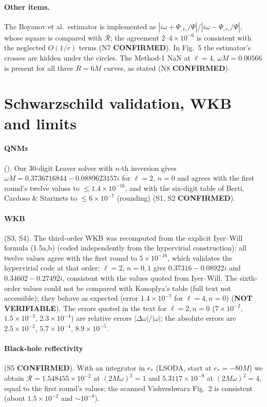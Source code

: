 \documentclass[11pt,a4paper]{article}
\newcommand{\OK}{\textcolor{green!50!black}{\textbf{CONFIRMED}}}
\newcommand{\NV}{\textcolor{gray!80!black}{\textbf{NOT VERIFIABLE}}}
\newcommand{\file}[1]{{\small\path{#1}}}
\begin{document}
\paragraph{Other items.} The Boyanov et al.\ estimator is implemented as $|i\omega+\Psi_{,r_*}/\Psi|/|i\omega-\Psi_{,r_*}/\Psi|$,
whose square is compared with $\mathcal R$; the agreement $2$--$4\times10^{-6}$ is consistent with the neglected $O(1/r)$
terms (N7 \OK). In Fig.~5 the estimator's crosses are hidden under the circles. The Method-1 NaN at $\ell=4$,
$\omega M=0.00566$ is present for all three $R=6M$ curves, as stated (N8 \OK).

\section{Schwarzschild validation, WKB and limits}
\paragraph{QNMs} (\file{c02}). Our 30-digit Leaver solver with $n$-th inversion gives
$\omega M=0.3736716844-0.0889623157i$ for $\ell=2$, $n=0$ and agrees with the first round's twelve values to
$\le1.4\times10^{-16}$, and with the six-digit table of Berti, Cardoso \& Starinets to $\le6\times10^{-7}$ (rounding)
(S1, S2 \OK).

\paragraph{WKB} (S3, S4). The third-order WKB was recomputed from the explicit Iyer--Will formula (1.5a,b)
(coded independently from the hypervirial construction): all twelve values agree with the first round to
$5\times10^{-16}$, which validates the hypervirial code at that order; $\ell=2$, $n=0,1$ give $0.37316-0.08922i$ and
$0.34602-0.27492i$, consistent with the values quoted from Iyer--Will. The sixth-order values could not be compared
with Konoplya's table (full text not accessible); they behave as expected (error $1.4\times10^{-7}$ for $\ell=4,n=0$)
(\NV). The errors quoted in the text for $\ell=2,n=0$ ($7\times10^{-2}$, $1.5\times10^{-3}$, $2.3\times10^{-4}$) are relative
errors $|\Delta\omega|/|\omega|$; the absolute errors are $2.5\times10^{-2}$, $5.7\times10^{-4}$, $8.9\times10^{-5}$.

\paragraph{Black-hole reflectivity} (S5 \OK). With an integrator in $r_*$ (LSODA, start at $r_*=-80M$) we obtain
$\mathcal R=1.548455\times10^{-2}$ at $(2M\omega)^2=1$ and $5.3117\times10^{-9}$ at $(2M\omega)^2=4$, equal to the first
round's values; the scanned Vishveshwara Fig.~2 is consistent (about $1.5\times10^{-2}$ and $\sim10^{-8}$).
\end{document}
